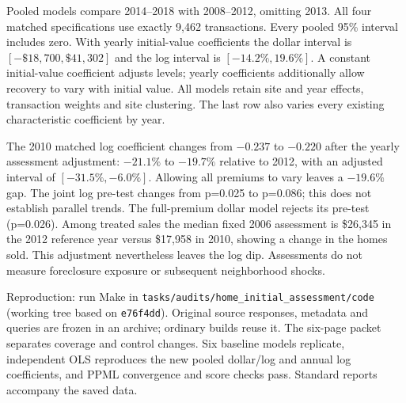 Pooled models compare 2014--2018 with 2008--2012, omitting 2013. All four
matched specifications use exactly 9,462 transactions. Every pooled 95\%
interval includes zero. With yearly initial-value coefficients the dollar
interval is $[-\$18{,}700,\$41{,}302]$ and the log interval is
$[-14.2\%,19.6\%]$. A constant initial-value coefficient adjusts levels;
yearly coefficients additionally allow recovery to vary with initial value.
All models retain site and year effects, transaction weights and site clustering.
The last row also varies every existing characteristic coefficient by year.

The 2010 matched log coefficient changes from $-0.237$ to $-0.220$ after
the yearly assessment adjustment: $-21.1\%$ to $-19.7\%$ relative to 2012,
with an adjusted interval of $[-31.5\%,-6.0\%]$. Allowing all premiums to
vary leaves a $-19.6\%$ gap. The joint log pre-test changes from p=0.025 to
p=0.086; this does not establish parallel trends. The full-premium dollar
model rejects its pre-test (p=0.026). Among treated sales the median fixed
2006 assessment is \$26,345 in the 2012 reference year versus \$17,958 in
2010, showing a change in the homes sold. This adjustment nevertheless
leaves the log dip. Assessments do not measure foreclosure exposure or
subsequent neighborhood shocks.

{\small Reproduction: run Make in
\texttt{tasks/audits/home\_initial\_assessment/code} (working tree based on
\texttt{e76f4dd}). Original source responses, metadata and queries are frozen
in an archive; ordinary builds reuse it. The six-page packet separates
coverage and control changes. Six baseline models replicate, independent OLS
reproduces the new pooled dollar/log and annual log coefficients, and PPML
convergence and score checks pass. Standard reports accompany the saved data.}
